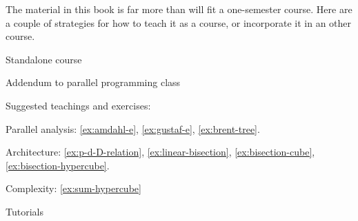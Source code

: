 
The material in this book is far more than will fit a one-semester course.
Here are a couple of strategies for how to teach it as a course,
or incorporate it in an other course.

 {Standalone course}

 {Addendum to parallel programming class}

Suggested teachings and exercises:

Parallel analysis:
\ref{ex:amdahl-e}, \ref{ex:gustaf-e}, \ref{ex:brent-tree}.

Architecture:
\ref{ex:p-d-D-relation}, \ref{ex:linear-bisection},
\ref{ex:bisection-cube}, \ref{ex:bisection-hypercube}.

Complexity: 
\ref{ex:sum-hypercube}

 {Tutorials}


